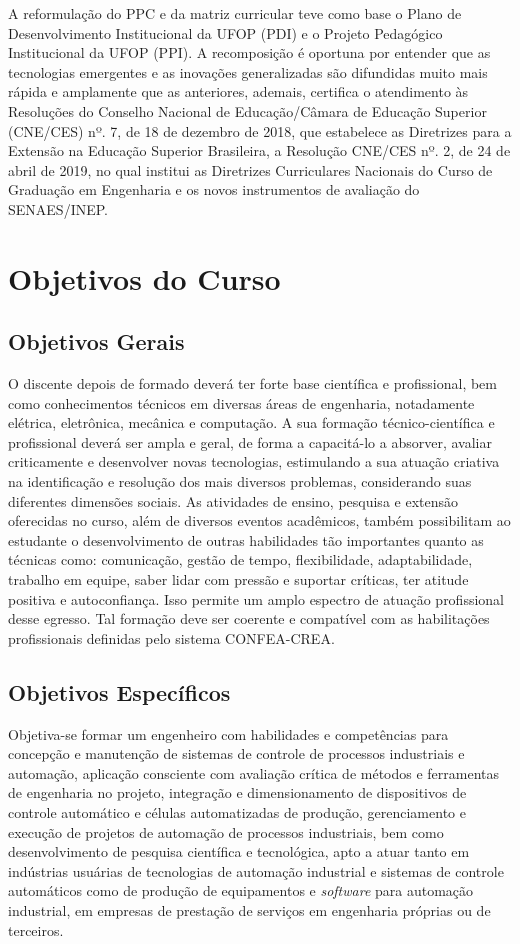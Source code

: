 \documentclass[
	12pt,				%
	openright,			%
	oneside,			%
	a4paper,			%
	english,			%
	brazil				%
	]{abntex2}
\begin{document}
A reformulação do PPC e da matriz curricular teve como base o Plano de Desenvolvimento Institucional da UFOP (PDI) e o Projeto Pedagógico Institucional da UFOP (PPI). A recomposição é oportuna por entender que as tecnologias emergentes e as inovações generalizadas são difundidas muito mais rápida e amplamente que as anteriores,  ademais, certifica o atendimento às Resoluções do Conselho Nacional de Educação/Câmara de Educação Superior (CNE/CES) nº. 7, de 18 de dezembro de 2018, que estabelece as Diretrizes para a Extensão na Educação Superior Brasileira, a Resolução CNE/CES nº. 2, de 24 de abril de 2019, no qual institui as Diretrizes Curriculares Nacionais do Curso de Graduação em Engenharia e os novos instrumentos de avaliação do SENAES/INEP.

\section{Objetivos do Curso}
%
\subsection{Objetivos Gerais}
O discente depois de formado deverá ter forte base científica e profissional, bem como conhecimentos técnicos em diversas áreas de engenharia, notadamente elétrica, eletrônica, mecânica e computação. A sua formação técnico-científica e profissional deverá ser ampla e geral, de forma a capacitá-lo a absorver, avaliar criticamente e desenvolver novas tecnologias, estimulando a sua atuação criativa na identificação e resolução dos mais diversos problemas, considerando suas diferentes dimensões sociais. As atividades de ensino, pesquisa e extensão oferecidas no curso, além de diversos eventos acadêmicos, também possibilitam ao estudante o desenvolvimento de outras habilidades tão importantes quanto as técnicas como: comunicação, gestão de tempo, flexibilidade, adaptabilidade, trabalho em equipe, saber lidar com pressão e suportar críticas, ter atitude positiva e autoconfiança. Isso permite um amplo espectro de atuação profissional desse egresso. Tal formação deve ser coerente e compatível com as habilitações profissionais definidas pelo sistema CONFEA-CREA.

\subsection{Objetivos Específicos}
Objetiva-se formar um engenheiro com habilidades e competências para concepção e manutenção de sistemas de controle de processos industriais e automação, aplicação consciente com avaliação crítica de métodos e ferramentas de engenharia no projeto, integração e dimensionamento de dispositivos de controle automático e células automatizadas de produção, gerenciamento e execução de projetos de automação de processos industriais, bem como desenvolvimento de pesquisa científica e tecnológica, apto a atuar tanto em indústrias usuárias de tecnologias de automação industrial e sistemas de controle automáticos como de produção de equipamentos e \textit{software} para automação industrial, em empresas de prestação de serviços em engenharia próprias ou de terceiros.
\end{document}
